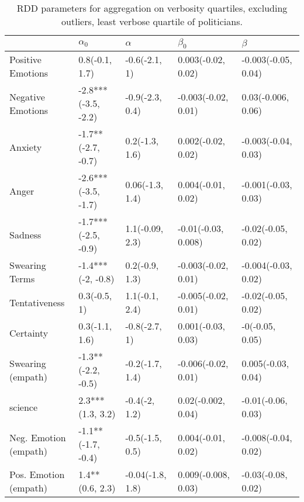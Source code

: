 \begin{table}[h]\centering
\caption{RDD parameters for aggregation on verbosity quartiles, excluding outliers, least verbose quartile of politicians.}
	\label{fig: Verbosity_8}
\begin{adjustbox}{width=\linewidth, center}
	\begin{tabular}{lllll}
	\toprule
	{} &           $\alpha_0$ &          $\alpha$ &            $\beta_0$ &              $\beta$ \\
	\midrule
	Positive Emotions     &       0.8(-0.1, 1.7) &     -0.6(-2.1, 1) &   0.003(-0.02, 0.02) &  -0.003(-0.05, 0.04) \\
	Negative Emotions     &  -2.8***(-3.5, -2.2) &   -0.9(-2.3, 0.4) &  -0.003(-0.02, 0.01) &   0.03(-0.006, 0.06) \\
	Anxiety               &   -1.7**(-2.7, -0.7) &    0.2(-1.3, 1.6) &   0.002(-0.02, 0.02) &  -0.003(-0.04, 0.03) \\
	Anger                 &  -2.6***(-3.5, -1.7) &   0.06(-1.3, 1.4) &   0.004(-0.01, 0.02) &  -0.001(-0.03, 0.03) \\
	Sadness               &  -1.7***(-2.5, -0.9) &   1.1(-0.09, 2.3) &  -0.01(-0.03, 0.008) &   -0.02(-0.05, 0.02) \\
	Swearing Terms        &    -1.4***(-2, -0.8) &    0.2(-0.9, 1.3) &  -0.003(-0.02, 0.01) &  -0.004(-0.03, 0.02) \\
	Tentativeness         &         0.3(-0.5, 1) &    1.1(-0.1, 2.4) &  -0.005(-0.02, 0.01) &   -0.02(-0.05, 0.02) \\
	Certainty             &       0.3(-1.1, 1.6) &     -0.8(-2.7, 1) &   0.001(-0.03, 0.03) &      -0(-0.05, 0.05) \\
	Swearing (empath)     &   -1.3**(-2.2, -0.5) &   -0.2(-1.7, 1.4) &  -0.006(-0.02, 0.01) &   0.005(-0.03, 0.04) \\
	science               &     2.3***(1.3, 3.2) &     -0.4(-2, 1.2) &   0.02(-0.002, 0.04) &   -0.01(-0.06, 0.03) \\
	Neg. Emotion (empath) &   -1.1**(-1.7, -0.4) &   -0.5(-1.5, 0.5) &   0.004(-0.01, 0.02) &  -0.008(-0.04, 0.02) \\
	Pos. Emotion (empath) &      1.4**(0.6, 2.3) &  -0.04(-1.8, 1.8) &  0.009(-0.008, 0.03) &   -0.03(-0.08, 0.02) \\
	\bottomrule
	\end{tabular}
	
\end{adjustbox}
	\end{table}

